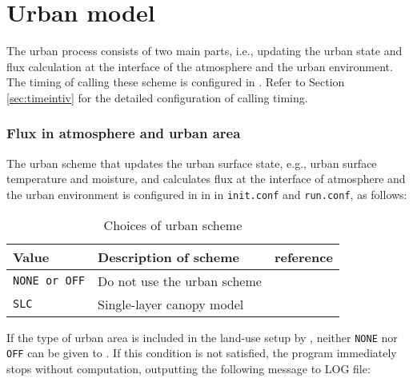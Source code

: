 \section{Urban model} \label{sec:basic_usel_urban}
The urban process consists of two main parts, i.e., updating the urban state and flux calculation at the interface of the atmosphere and the urban environment. The timing of calling these scheme is configured in . Refer to Section \ref{sec:timeintiv} for the detailed configuration of calling timing.

\subsubsection{Flux in atmosphere and urban area}

The urban scheme that updates the urban surface state, e.g., urban surface temperature and moisture, and calculates flux at the interface of atmosphere and the urban environment is configured in  in  in \verb|init.conf| and \verb|run.conf|, as follows:

\begin{table}[hbt]
\begin{center}
  \caption{Choices of urban scheme}
  \label{tab:nml_urban}
  \begin{tabularx}{150mm}{llX} \hline
    \rowcolor[gray]{0.9}  Value  & Description of scheme & reference \\ \hline
      \verb|NONE or OFF|  & Do not use the urban scheme            \\
      \verb|SLC|          & Single-layer canopy model  & \citet{kusaka_2001} \\
    \hline
  \end{tabularx}
\end{center}
\end{table}

If the type of urban area is included in the land-use setup by , neither \verb|NONE| nor \verb|OFF| can be given to . If this condition is not satisfied, the program immediately stops without computation, outputting the following message to LOG file:

